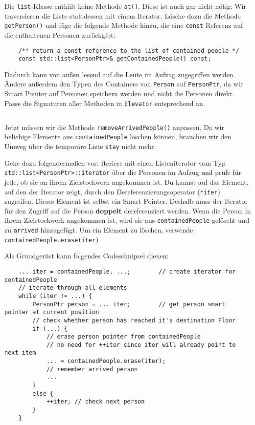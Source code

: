 Die \lstinline{list}-Klasse enthält keine Methode \lstinline{at()}.
Diese ist auch gar nicht nötig:
Wir traversieren die Liste stattdessen mit einem Iterator.
Lösche dazu die Methode \lstinline{getPerson()} und füge die folgende Methode hinzu, die eine \lstinline{const} Referenz auf die enthaltenen Personen zurückgibt:

\begin{lstlisting}
	/** return a const reference to the list of contained people */
	const std::list<PersonPtr>& getContainedPeople() const;
\end{lstlisting}

Dadurch kann von außen lesend auf die Leute im Aufzug zugegriffen werden.
Ändere außerdem den Typen des Containers von \lstinline{Person} auf \lstinline{PersonPtr}, da wir Smart Pointer auf Personen speichern werden und nicht die Personen direkt.
Passe die Signaturen aller Methoden in \lstinline{Elevator} entsprechend an.

\subsection{}
Jetzt müssen wir die Methode \lstinline{removeArrivedPeople()} anpassen.
Da wir beliebige Elemente aus \lstinline{containedPeople} löschen können, brauchen wir den Umweg über die temporäre Liste \lstinline{stay} nicht mehr.

Gehe dazu folgendermaßen vor:
Iteriere mit einen Listeniterator vom Typ \lstinline{std::list<PersonPtr>::iterator} über die Personen im Aufzug und prüfe für jede, ob sie an ihrem Zielstockwerk angekommen ist.
Du kannst auf das Element, auf den der Iterator zeigt, durch den Dereferenzierungsoperator (\lstinline{*iter}) zugreifen.
Dieses Element ist selbst ein Smart Pointer.
Deshalb muss der Iterator für den Zugriff auf die Person \textbf{doppelt} dereferenziert werden.
Wenn die Person in ihrem Zielstockwerk angekommen ist, wird sie aus \lstinline{containedPeople} gelöscht und zu \lstinline{arrived} hinzugefügt.
Um ein Element zu löschen, verwende \lstinline{containedPeople.erase(iter)}.


Als Grundgerüst kann folgendes Codeschnipsel dienen:

\begin{lstlisting}
	... iter = containedPeople. ...;		// create iterator for containedPeople
	// iterate through all elements
	while (iter != ...) {
		PersonPtr person = ... iter; 		// get person smart pointer at current position
		// check whether person has reached it's destination Floor
		if (...) {
			// erase person pointer from containedPeople
			// no need for ++iter since iter will already point to next item
			... = containedPeople.erase(iter);
			// remember arrived person
			...
		}
		else {
			++iter; // check next person
		}
	}
\end{lstlisting}


